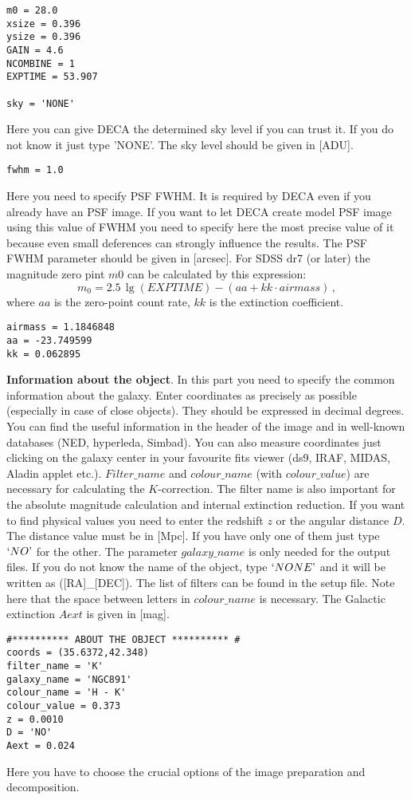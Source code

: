 \documentclass[
aps,%
12pt,%
final,%
notitlepage,%
oneside,%
onecolumn,%
nobibnotes,%
nofootinbib,%
superscriptaddress,%
noshowpacs,%
centertags]%
{revtex4}
\begin{document}
\begin{verbatim}
m0 = 28.0 					
xsize = 0.396					
ysize = 0.396					
GAIN = 4.6					
NCOMBINE = 1					
EXPTIME = 53.907				

sky = 'NONE'					
\end{verbatim}
	Here you can give DECA the determined sky level if you can trust it. If you do not know it just type 'NONE'. The sky level should be given in [ADU].
\begin{verbatim}
fwhm = 1.0 					 
\end{verbatim}
	Here you need to specify PSF FWHM. It is required by DECA even if you already have an PSF image. If you want to let DECA create model PSF image using this value of FWHM you need to specify here the most precise value of it because even small deferences can strongly influence the results. The PSF FWHM parameter should be given in [arcsec]. For SDSS dr7 (or later) the magnitude zero pint $m0$ can be calculated by this expression:
\[
 m_{0} = 2.5\,\lg(EXPTIME)-(aa+kk\cdot airmass) \, ,
\]
where $aa$ is the zero-point count rate, $kk$ is the extinction coefficient. 
\begin{verbatim}
airmass = 1.1846848					
aa = -23.749599					
kk = 0.062895					
\end{verbatim}

\textbf{Information about the object}. In this part you need to specify the common information about the galaxy. Enter coordinates as precisely as possible (especially in case of close objects). They should be expressed in decimal degrees. You can find the useful information in the header of the image and in well-known databases (NED, hyperleda, Simbad). You can also measure coordinates just clicking on the galaxy center in your favourite fits viewer (ds9, IRAF, MIDAS, Aladin applet etc.). $Filter\_name$ and $colour\_name$ (with $colour\_value$) are necessary for calculating the $K$-correction. The filter name is also important for the absolute magnitude calculation and internal extinction reduction. If you want to find physical values you need to enter the redshift $z$ or the angular distance $D$. The distance value must be in [Mpc]. If you have only one of them just type $`NO\textrm'$ for the other. The parameter $galaxy\_name$ is only needed for the output files. If you do not know the name of the object, type $`NONE\textrm'$ and it will be written as ([RA]\_[DEC]). The list of filters can be found in the setup file. Note here that the space between letters in $colour\_name$ is necessary.  The Galactic extinction $Aext$ is given in [mag].
\begin{verbatim} 
#********** ABOUT THE OBJECT ********** #
coords = (35.6372,42.348) 			
filter_name = 'K'				
galaxy_name = 'NGC891'				
colour_name = 'H - K'				
colour_value = 0.373				
z = 0.0010					
D = 'NO'					
Aext = 0.024					
\end{verbatim}
Here you have to choose the crucial options of the image preparation and decomposition. 
\end{document}
